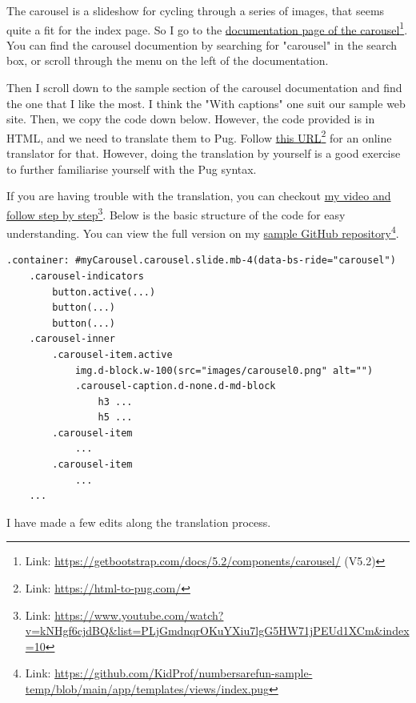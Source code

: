 The carousel is a slideshow for cycling through a series of images, that seems quite a fit for the index page. So I go to the \href{https://getbootstrap.com/docs/5.2/components/carousel/}{documentation page of the carousel}\footnote{Link: \url{https://getbootstrap.com/docs/5.2/components/carousel/} (V5.2)}. You can find the carousel documention by searching for "carousel" in the search box, or scroll through the menu on the left of the documentation. 

Then I scroll down to the sample section of the carousel documentation and find the one that I like the most. I think the "With captions" one suit our sample web site. Then, we copy the code down below. However, the code provided is in HTML, and we need to translate them to Pug. Follow \href{https://html-to-pug.com/}{this URL}\footnote{Link: \url{https://html-to-pug.com/}} for an online translator for that. However, doing the translation by yourself is a good exercise to further familiarise yourself with the Pug syntax. 

If you are having trouble with the translation, you can checkout \href{https://www.youtube.com/watch?v=kNHgf6cjdBQ&list=PLjGmdnqrOKuYXiu7lgG5HW71jPEUd1XCm&index=10}{my video and follow step 
 by step}\footnote{Link: \url{https://www.youtube.com/watch?v=kNHgf6cjdBQ&list=PLjGmdnqrOKuYXiu7lgG5HW71jPEUd1XCm&index=10}}. Below is the basic structure of the code for easy understanding. You can view the full version on my \href{https://github.com/KidProf/numbersarefun-sample-temp/blob/main/app/templates/views/index.pug}{sample GitHub repository}\footnote{Link: \url{https://github.com/KidProf/numbersarefun-sample-temp/blob/main/app/templates/views/index.pug}}.

\begin{lstlisting}[language=pug]
.container: #myCarousel.carousel.slide.mb-4(data-bs-ride="carousel")
    .carousel-indicators
        button.active(...)
        button(...)
        button(...)
    .carousel-inner
        .carousel-item.active
            img.d-block.w-100(src="images/carousel0.png" alt="")
            .carousel-caption.d-none.d-md-block
                h3 ...
                h5 ...
        .carousel-item
            ...
        .carousel-item
            ...
    ...
\end{lstlisting}

I have made a few edits along the translation process. 

